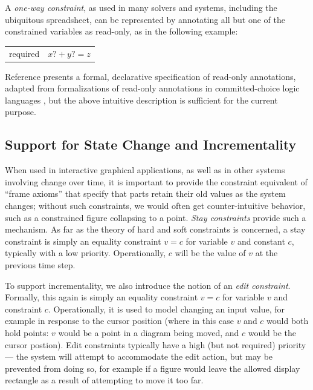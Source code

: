 A \emph{one-way constraint}, as used in many solvers and systems,
including the ubiquitous spreadsheet, can be represented by annotating
all but one of the constrained variables as read-only, as in the
following example:

\begin{center}
\begin{tabular}{rl}
required &     $x?+y?=z$ \\
\end{tabular}
\end{center}

Reference \cite{borning-lisp-symbolic-computation-1992} presents a
formal, declarative specification of read-only annotations, adapted
from formalizations of read-only annotations in committed-choice logic
languages \cite{maher-iclp-1987}, but the above intuitive description
is sufficient for the current purpose.

\subsection{Support for State Change and Incrementality}
\label{sec:state-change}

When used in interactive graphical applications, as well as in other
systems involving change over time, it is important to provide the
constraint equivalent of ``frame axioms'' that specify that parts
retain their old values as the system changes; without such
constraints, we would often get counter-intuitive behavior, such as a
constrained figure collapsing to a point.  \emph{Stay constraints}
provide such a mechanism.  As far as the theory of hard and soft
constraints is concerned, a stay constraint is simply an equality
constraint $v=c$ for variable $v$ and constant $c$, typically with a
low priority.  Operationally, $c$ will be the value of $v$ at the
previous time step.

To support incrementality, we also introduce the notion of an
\emph{edit constraint}.  Formally, this again is simply an equality
constraint $v=c$ for variable $v$ and constraint $c$.  Operationally,
it is used to model \DIFdelbegin {}\DIFdelend changing an input value, for example in
response to the cursor position (where in this case $v$ and $c$ would
both hold points: $v$ would be a point in a diagram being moved, and
$c$ would be the cursor postion).  Edit constraints typically have a
high (but not required) priority --- the system will attempt to
accommodate the edit action, but may be prevented from doing so, for
example if a figure would leave the allowed display rectangle as a
result of attempting to move it too far.

